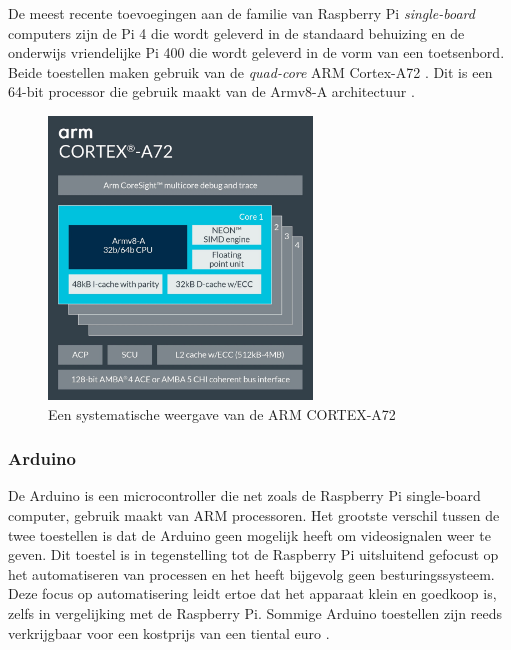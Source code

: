 De meest recente toevoegingen aan de familie van Raspberry Pi \textit{single-board} computers zijn de Pi 4 die wordt geleverd in de standaard behuizing en de onderwijs vriendelijke Pi 400 die wordt geleverd in de vorm van een toetsenbord. Beide toestellen maken gebruik van de \textit{quad-core} ARM Cortex-A72 \autocite{Pi2022}. Dit is een 64-bit processor die gebruik maakt van de Armv8-A architectuur \autocite{armDeveloper2022}.

\begin{figure}[!h]
    \centering
    \includegraphics[width=70mm, scale=0.5]{img/Cortex-A72.jpg}
    \caption{Een systematische weergave van de ARM CORTEX-A72 \autocite{armDeveloper2022}}
\end{figure}

\subsubsection{Arduino}
De Arduino is een microcontroller die net zoals de Raspberry Pi single-board computer, gebruik maakt van ARM processoren. Het grootste verschil tussen de twee toestellen is dat de Arduino geen mogelijk heeft om videosignalen weer te geven. Dit toestel is in tegenstelling tot de Raspberry Pi uitsluitend gefocust op het automatiseren van processen en het heeft bijgevolg geen besturingssysteem. Deze focus op automatisering leidt ertoe dat het apparaat klein en goedkoop is, zelfs in vergelijking met de Raspberry Pi. Sommige Arduino toestellen zijn reeds verkrijgbaar voor een kostprijs van een tiental euro \autocite{Arduino2018}. 

